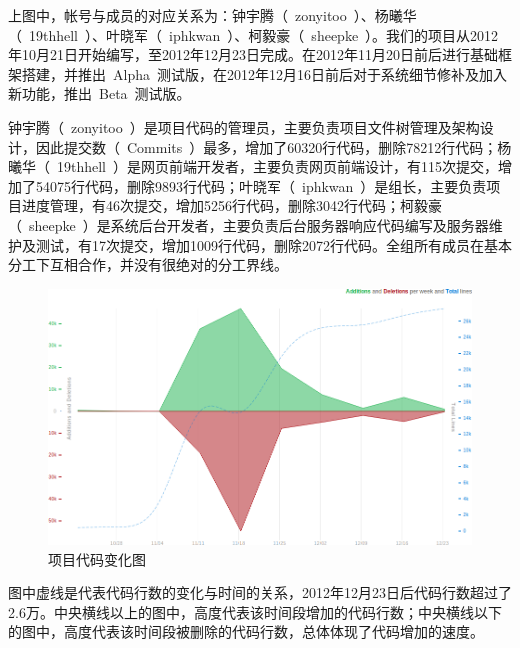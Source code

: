 上图中，帐号与成员的对应关系为：钟宇腾（~zonyitoo~）、杨曦华（~19thhell~）、叶晓军（~iphkwan~）、柯毅豪（~sheepke~）。我们的项目从2012年10月21日开始编写，至2012年12月23日完成。在2012年11月20日前后进行基础框架搭建，并推出~Alpha~测试版，在2012年12月16日前后对于系统细节修补及加入新功能，推出~Beta~测试版。

钟宇腾（~zonyitoo~）是项目代码的管理员，主要负责项目文件树管理及架构设计，因此提交数（~Commits~）最多，增加了60320行代码，删除78212行代码；杨曦华（~19thhell~）是网页前端开发者，主要负责网页前端设计，有115次提交，增加了54075行代码，删除9893行代码；叶晓军（~iphkwan~）是组长，主要负责项目进度管理，有46次提交，增加5256行代码，删除3042行代码；柯毅豪（~sheepke~）是系统后台开发者，主要负责后台服务器响应代码编写及服务器维护及测试，有17次提交，增加1009行代码，删除2072行代码。全组所有成员在基本分工下互相合作，并没有很绝对的分工界线。

\begin{figure}[H]
   \centering \includegraphics[width=\textwidth]{img/code_freq.png}
   \caption{项目代码变化图}
\end{figure}

图中虚线是代表代码行数的变化与时间的关系，2012年12月23日后代码行数超过了2.6万。中央横线以上的图中，高度代表该时间段增加的代码行数；中央横线以下的图中，高度代表该时间段被删除的代码行数，总体体现了代码增加的速度。
